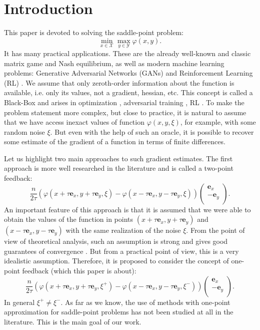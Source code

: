 \documentclass[runningheads]{llncs}
\begin{document}
\section{Introduction}

This paper is devoted to solving the saddle-point problem:
\begin{equation}
    \label{problem}
    \min_{x\in \mathcal{X}}\max_{y\in \mathcal{Y}}  \varphi(x, y).  
\end{equation}
It has many practical applications. These are the already well-known and classic matrix game and Nash equilibrium, as well as modern machine learning problems: Generative Adversarial Networks (GANs) \cite{goodfellow2016nips} and Reinforcement Learning (RL) \cite{pmlr-v119-jin20f}. We assume that only zeroth-order information about the function is available, i.e. only its values, not a gradient, hessian, etc. This concept is called a Black-Box and arises in optimization \cite{Nesterov}, adversarial training \cite{Chen_2017}, RL \cite{fazel2018global}. To make the problem statement more complex, but close to practice, it is natural to assume that we have access inexact values of function $\varphi(x, y, \xi)$, for example, with some random noise $\xi$. But even with the help of such an oracle, it is possible to recover some estimate of the gradient of a function in terms of finite differences.

Let us highlight two main approaches to such gradient estimates. The first approach is more well researched in the literature and is called a two-point feedback:
$$\frac{n}{2\tau} (\varphi(x+  \tau \mathbf{e}_x, y+  \tau \mathbf{e}_y, \xi)  - \varphi(x - \tau \mathbf{e}_x, y-  \tau \mathbf{e}_y, \xi)) \left(
    \begin{array}{c}
    \mathbf{e}_x\\
    -\mathbf{e}_y \\
    \end{array}
    \right).$$
An important feature of this approach is that it is assumed that we were able to obtain the values of the function in points $(x+  \tau \mathbf{e}_x, y+  \tau \mathbf{e}_y)$ and $(x - \tau \mathbf{e}_x, y-  \tau \mathbf{e}_y)$ with the same realization of the noise $\xi$. From the point of view of theoretical analysis, such an assumption is strong and gives good guarantees of convergence \cite{duchi2013optimal,Shamir15,Nesterov}. But from a practical point of view, this is a very idealistic assumption. Therefore, it is proposed to consider the concept of one-point feedback (which this paper is about):
$$\frac{n}{2\tau} (\varphi(x+  \tau \mathbf{e}_x, y+  \tau \mathbf{e}_y, \xi^+)  - \varphi(x - \tau \mathbf{e}_x, y-  \tau \mathbf{e}_y, \xi^-)) \left(
    \begin{array}{c}
    \mathbf{e}_x\\
    -\mathbf{e}_y \\
    \end{array}
    \right).$$
In general $\xi^+ \neq \xi^-$. As far as we know, the use of methods with one-point approximation for saddle-point problems has not been studied at all in the literature. This is the main goal of our work.
\end{document}

